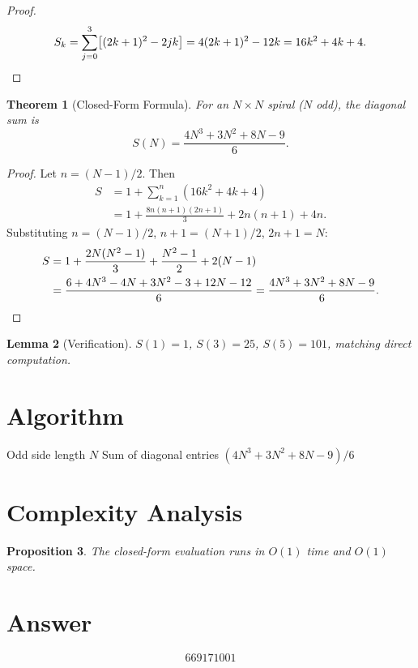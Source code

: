 \documentclass[12pt,a4paper]{article}
\newtheorem{theorem}{Theorem}
\newtheorem{lemma}[theorem]{Lemma}
\newtheorem{proposition}[theorem]{Proposition}
\theoremstyle{definition}
\begin{document}
\begin{proof}
\[
S_k = \sum_{j=0}^{3}\bigl[(2k+1)^2 - 2jk\bigr] = 4(2k+1)^2 - 12k = 16k^2 + 4k + 4. \qedhere
\]
\end{proof}

\begin{theorem}[Closed-Form Formula]\label{thm:closed}
For an $N \times N$ spiral ($N$ odd), the diagonal sum is
\[
S(N) = \frac{4N^3 + 3N^2 + 8N - 9}{6}.
\]
\end{theorem}

\begin{proof}
Let $n = (N-1)/2$. Then
\begin{align*}
S &= 1 + \sum_{k=1}^{n}(16k^2 + 4k + 4) \\
  &= 1 + \frac{8n(n+1)(2n+1)}{3} + 2n(n+1) + 4n.
\end{align*}
Substituting $n = (N-1)/2$, $n+1 = (N+1)/2$, $2n+1 = N$:
\begin{align*}
S &= 1 + \frac{2N(N^2-1)}{3} + \frac{N^2-1}{2} + 2(N-1) \\
  &= \frac{6 + 4N^3 - 4N + 3N^2 - 3 + 12N - 12}{6} = \frac{4N^3 + 3N^2 + 8N - 9}{6}. \qedhere
\end{align*}
\end{proof}

\begin{lemma}[Verification]
$S(1) = 1$, $S(3) = 25$, $S(5) = 101$, matching direct computation.
\end{lemma}

\section{Algorithm}

\begin{algorithm}[H]
\caption{Spiral Diagonal Sum}
\begin{algorithmic}[1]
\REQUIRE Odd side length $N$
\ENSURE Sum of diagonal entries
\RETURN $(4N^3 + 3N^2 + 8N - 9) / 6$
\end{algorithmic}
\end{algorithm}

\section{Complexity Analysis}

\begin{proposition}
The closed-form evaluation runs in $O(1)$ time and $O(1)$ space.
\end{proposition}

\section{Answer}

\[
\boxed{669171001}
\]
\end{document}
